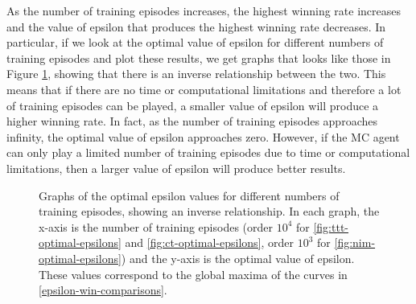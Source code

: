\documentclass[11pt,a4paper]{report}
\begin{document}
As the number of training episodes increases, the highest winning rate increases and the value of epsilon that produces the highest winning rate decreases. In particular, if we look at the optimal value of epsilon for different numbers of training episodes and plot these results, we get graphs that looks like those in Figure \ref{training-vs-opt-epsilon}, showing that there is an inverse relationship between the two. This means that if there are no time or computational limitations and therefore a lot of training episodes can be played, a smaller value of epsilon will produce a higher winning rate. In fact, as the number of training episodes approaches infinity, the optimal value of epsilon approaches zero. However, if the MC agent can only play a limited number of training episodes due to time or computational limitations, then a larger value of epsilon will produce better results.

\begin{figure}[htbp]
    \centering
	\caption{Graphs of the optimal epsilon values for different numbers of training episodes, showing an inverse relationship. In each graph, the x-axis is the number of training episodes (order $10^4$ for \ref{fig:ttt-optimal-epsilons} and \ref{fig:ct-optimal-epsilons}, order $10^3$ for \ref{fig:nim-optimal-epsilons}) and the y-axis is the optimal value of epsilon. These values correspond to the global maxima of the curves in \ref{epsilon-win-comparisons}. }
	\label{training-vs-opt-epsilon}
\end{figure}
\end{document}
